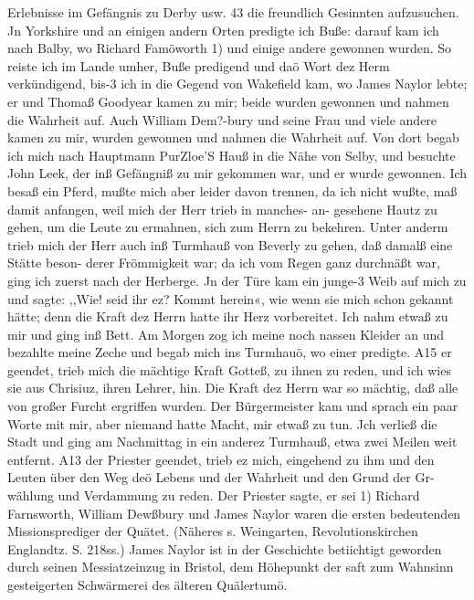 Erlebnisse im Gefängnis zu Derby usw. 43
die freundlich Gesinnten aufzusuchen. Jn Yorkshire und an einigen
andern Orten predigte ich Buße: darauf kam ich nach Balby,
wo Richard Famöworth 1) und einige andere gewonnen wurden.
So reiste ich im Lande umher, Buße predigend und daö Wort
dez Herm verkündigend, bis-3 ich in die Gegend von Wakefield
kam, wo James Naylor lebte; er und Thomaß Goodyear
kamen zu mir; beide wurden gewonnen und nahmen die Wahrheit
auf. Auch William Dem?-bury und seine Frau und viele andere
kamen zu mir, wurden gewonnen und nahmen die Wahrheit auf.
Von dort begab ich mich nach Hauptmann PurZloe’S Hauß in
die Nähe von Selby, und besuchte John Leek, der inß Gefängniß
zu mir gekommen war, und er wurde gewonnen. Ich besaß ein
Pferd, mußte mich aber leider davon trennen, da ich nicht wußte,
maß damit anfangen, weil mich der Herr trieb in manches- an-
gesehene Hautz zu gehen, um die Leute zu ermahnen, sich zum
Herrn zu bekehren. Unter anderm trieb mich der Herr auch inß
Turmhauß von Beverly zu gehen, daß damalß eine Stätte beson-
derer Frömmigkeit war; da ich vom Regen ganz durchnäßt war,
ging ich zuerst nach der Herberge. Jn der Türe kam ein junge-3
Weib auf mich zu und sagte: ,,Wie! seid ihr ez? Kommt herein«,
wie wenn sie mich schon gekannt hätte; denn die Kraft dez Herrn
hatte ihr Herz vorbereitet. Ich nahm etwaß zu mir und ging
inß Bett. Am Morgen zog ich meine noch nassen Kleider an
und bezahlte meine Zeche und begab mich ins Turmhauö, wo
einer predigte. A15 er geendet, trieb mich die mächtige Kraft Gotteß,
zu ihnen zu reden, und ich wies sie aus Chrisiuz, ihren Lehrer, hin.
Die Kraft dez Herrn war so mächtig, daß alle von großer Furcht
ergriffen wurden. Der Bürgermeister kam und sprach ein paar
Worte mit mir, aber niemand hatte Macht, mir etwaß zu tun.
Jch verließ die Stadt und ging am Nachmittag in ein anderez
Turmhauß, etwa zwei Meilen weit entfernt. A13 der Priester
geendet, trieb ez mich, eingehend zu ihm und den Leuten über
den Weg deö Lebens und der Wahrheit und den Grund der Gr-
wählung und Verdammung zu reden. Der Priester sagte, er sei
1) Richard Farnsworth, William Dewßbury und James Naylor waren
die ersten bedeutenden Missionsprediger der Quätet. (Näheres s. Weingarten,
Revolutionskirchen Englandtz. S. 218ss.) James Naylor ist in der Geschichte
betiichtigt geworden durch seinen Messiatzeinzug in Bristol, dem Höhepunkt der
saft zum Wahnsinn gesteigerten Schwärmerei des älteren Quälertumö.


